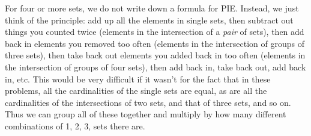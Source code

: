 \documentclass[10pt,]{book}
\theoremstyle{plain}
\theoremstyle{definition}
\theoremstyle{definition}
\theoremstyle{definition}
\theoremstyle{definition}
\numberwithin{equation}{chapter}
\begin{document}
\hypertarget{p-955}{}%
For four or more sets, we do not write down a formula for PIE. Instead, we just think of the principle: add up all the elements in single sets, then subtract out things you counted twice (elements in the intersection of a \emph{pair} of sets), then add back in elements you removed too often (elements in the intersection of groups of three sets), then take back out elements you added back in too often (elements in the intersection of groups of four sets), then add back in, take back out, add back in, etc. This would be very difficult if it wasn't for the fact that in these problems, all the cardinalities of the single sets are equal, as are all the cardinalities of the intersections of two sets, and that of three sets, and so on. Thus we can group all of these together and multiply by how many different combinations of 1, 2, 3, \textellipsis{} sets there are.%
\end{document}
